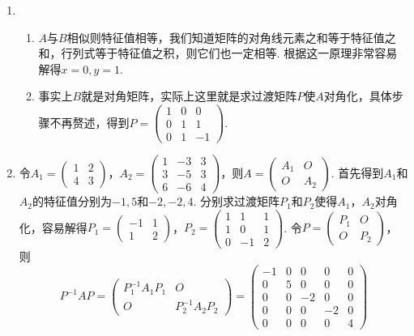 \begin{enumerate}
    \item \begin{enumerate}
        \item $A$与$B$相似则特征值相等，我们知道矩阵的对角线元素之和等于特征值之和，行列式等于特征值之积，则它们也一定相等. 根据这一原理非常容易解得$x=0,y=1$.
        \item 事实上$B$就是对角矩阵，实际上这里就是求过渡矩阵$P$使$A$对角化，具体步骤不再赘述，得到$P=\begin{pmatrix}
            1 & 0 & 0 \\ 0 & 1 & 1 \\ 0 & 1 & -1
        \end{pmatrix}$.
    \end{enumerate}

    \item 令$A_1=\begin{pmatrix}
        1 & 2 \\ 4 & 3
    \end{pmatrix}$，$A_2=\begin{pmatrix}
        1 & -3 & 3 \\ 3 & -5 & 3 \\ 6 & -6 & 4
    \end{pmatrix}$，则$A=\begin{pmatrix}
        A_1 & O \\ O & A_2
    \end{pmatrix}$. 首先得到$A_1$和$A_2$的特征值分别为$-1,5$和$-2,-2,4$. 分别求过渡矩阵$P_1$和$P_2$使得$A_1$，$A_2$对角化，容易解得$P_1=\begin{pmatrix}
        -1 & 1 \\ 1 & 2
    \end{pmatrix}$，$P_2=\begin{pmatrix}
        1 & 1 & 1 \\ 1 & 0 & 1 \\ 0 & -1 & 2
    \end{pmatrix}$. 令$P=\begin{pmatrix}
        P_1 & O \\ O & P_2
    \end{pmatrix}$，则
    \[P^{-1}AP=\begin{pmatrix}
        P_1^{-1}A_1P_1 & O \\ O & P_2^{-1}A_2P_2
    \end{pmatrix}=\begin{pmatrix}
        -1 & 0 & 0 & 0 & 0 \\ 0 & 5 & 0 & 0 & 0 \\ 0 & 0 & -2 & 0 & 0 \\ 0 & 0 & 0 & -2 & 0 \\ 0 & 0 & 0 & 0 & 4

\end{pmatrix}\]
\end{enumerate}
